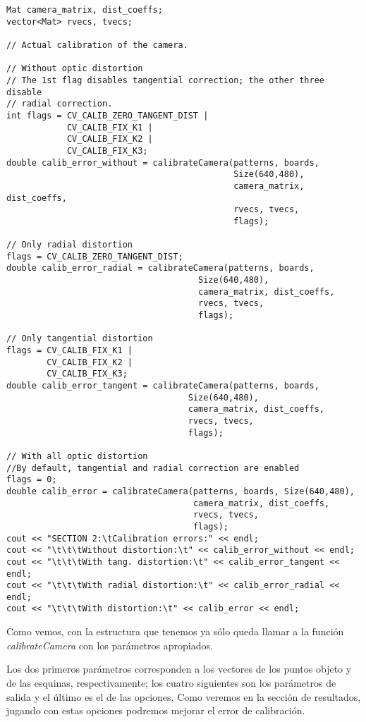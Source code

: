\documentclass[a4paper, 11pt]{article}
\theoremstyle{definition}
\theoremstyle{theorem}
\begin{document}
    \begin{lstlisting}
Mat camera_matrix, dist_coeffs;
vector<Mat> rvecs, tvecs;

// Actual calibration of the camera.

// Without optic distortion
// The 1st flag disables tangential correction; the other three disable
// radial correction.
int flags = CV_CALIB_ZERO_TANGENT_DIST |
            CV_CALIB_FIX_K1 |
            CV_CALIB_FIX_K2 |
            CV_CALIB_FIX_K3;
double calib_error_without = calibrateCamera(patterns, boards,
                                             Size(640,480),
                                             camera_matrix, dist_coeffs,
                                             rvecs, tvecs,
                                             flags);

// Only radial distortion
flags = CV_CALIB_ZERO_TANGENT_DIST;
double calib_error_radial = calibrateCamera(patterns, boards,
                                      Size(640,480),
                                      camera_matrix, dist_coeffs,
                                      rvecs, tvecs,
                                      flags);

// Only tangential distortion
flags = CV_CALIB_FIX_K1 |
        CV_CALIB_FIX_K2 |
        CV_CALIB_FIX_K3;
double calib_error_tangent = calibrateCamera(patterns, boards,
                                    Size(640,480),
                                    camera_matrix, dist_coeffs,
                                    rvecs, tvecs,
                                    flags);

// With all optic distortion
//By default, tangential and radial correction are enabled
flags = 0;
double calib_error = calibrateCamera(patterns, boards, Size(640,480),
                                     camera_matrix, dist_coeffs,
                                     rvecs, tvecs,
                                     flags);
cout << "SECTION 2:\tCalibration errors:" << endl;
cout << "\t\t\tWithout distortion:\t" << calib_error_without << endl;
cout << "\t\t\tWith tang. distortion:\t" << calib_error_tangent << endl;
cout << "\t\t\tWith radial distortion:\t" << calib_error_radial << endl;
cout << "\t\t\tWith distortion:\t" << calib_error << endl;
    \end{lstlisting}

    Como vemos, con la estructura que tenemos ya sólo queda llamar a la función \emph{calibrateCamera} con los parámetros apropiados.

    Los dos primeros parámetros corresponden a los vectores de los puntos objeto y de las esquinas, respectivamente; los cuatro siguientes son los parámetros de salida y el último es el de las opciones. Como veremos en la sección de resultados, jugando con estas opciones podremos mejorar el error de calibración.
\end{document}
